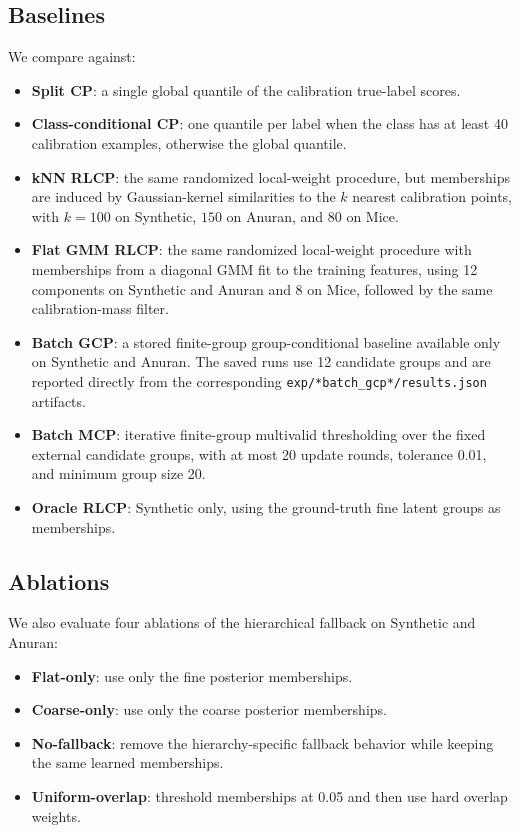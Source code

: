 \documentclass{article}
\begin{document}
\subsection{Baselines}
We compare against:
\begin{itemize}
  \item \textbf{Split CP}: a single global quantile of the calibration true-label scores.
  \item \textbf{Class-conditional CP}: one quantile per label when the class has at least 40 calibration examples, otherwise the global quantile.
  \item \textbf{kNN RLCP}: the same randomized local-weight procedure, but memberships are induced by Gaussian-kernel similarities to the $k$ nearest calibration points, with $k=100$ on Synthetic, $150$ on Anuran, and $80$ on Mice.
  \item \textbf{Flat GMM RLCP}: the same randomized local-weight procedure with memberships from a diagonal GMM fit to the training features, using 12 components on Synthetic and Anuran and 8 on Mice, followed by the same calibration-mass filter.
  \item \textbf{Batch GCP}: a stored finite-group group-conditional baseline available only on Synthetic and Anuran. The saved runs use 12 candidate groups and are reported directly from the corresponding \texttt{exp/*batch\_gcp*/results.json} artifacts.
  \item \textbf{Batch MCP}: iterative finite-group multivalid thresholding over the fixed external candidate groups, with at most 20 update rounds, tolerance 0.01, and minimum group size 20.
  \item \textbf{Oracle RLCP}: Synthetic only, using the ground-truth fine latent groups as memberships.
\end{itemize}

\subsection{Ablations}
We also evaluate four ablations of the hierarchical fallback on Synthetic and Anuran:
\begin{itemize}
  \item \textbf{Flat-only}: use only the fine posterior memberships.
  \item \textbf{Coarse-only}: use only the coarse posterior memberships.
  \item \textbf{No-fallback}: remove the hierarchy-specific fallback behavior while keeping the same learned memberships.
  \item \textbf{Uniform-overlap}: threshold memberships at 0.05 and then use hard overlap weights.
\end{itemize}
\end{document}
